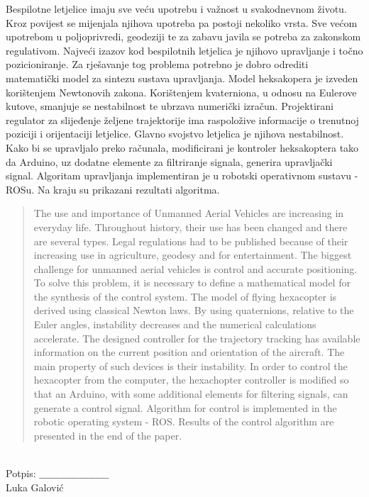 \documentclass[times, utf8, diplomski]{fer}
\begin{document}
\begin{sazetak}
Bespilotne letjelice imaju sve veću upotrebu i važnost u svakodnevnom životu. Kroz povijest se mijenjala njihova upotreba pa postoji nekoliko vrsta. Sve većom upotrebom u poljoprivredi, geodeziji te za zabavu javila se potreba za zakonskom regulativom. Najveći izazov kod bespilotnih letjelica je njihovo upravljanje i točno pozicioniranje. Za rješavanje tog problema potrebno je dobro odrediti matematički model za sintezu sustava upravljanja. Model heksakopera je izveden korištenjem Newtonovih zakona. Korištenjem kvaterniona, u odnosu na Eulerove kutove, smanjuje se nestabilnost te ubrzava numerički izračun. Projektirani regulator za slijeđenje željene trajektorije ima raspoložive informacije o trenutnoj poziciji i orijentaciji letjelice. Glavno svojstvo letjelica je njihova nestabilnost. Kako bi se upravljalo preko računala, modificirani je kontroler heksakoptera tako da Arduino, uz dodatne elemente za filtriranje signala, generira upravljački signal. Algoritam upravljanja implementiran je u robotski operativnom sustavu - ROSu. Na kraju su prikazani rezultati algoritma. 

\end{sazetak}
\newpage
\begin{abstract}
The use and importance of Unmanned Aerial Vehicles are increasing in everyday life. Throughout history, their use has been changed and there are several types. Legal regulations had to be published because of their increasing use in agriculture, geodesy and for entertainment. The biggest challenge for unmanned aerial vehicles is control and accurate positioning.
To solve this problem, it is necessary to define a mathematical model for the synthesis of the control system. The model of flying hexacopter is derived using classical Newton laws. By using quaternions, relative to the Euler angles, instability decreases and the numerical calculations accelerate. The designed controller for the trajectory tracking has available information on the current position and orientation of the aircraft. The main property of such devices is their instability. In order to control the hexacopter from the computer, the hexachopter controller is modified so that an Arduino, with some additional elements for filtering signals, can generate a control signal. Algorithm for control is implemented in the robotic operating system - ROS. Results of the control algorithm are presented in the end of the paper.

\end{abstract}\\

\hspace*{0pt}\hfill Potpis:  $\_\_\_\_\_\_\_\_\_\_\_\_\_\_\_\_\_\_\_\_\_$\\
\hspace*{5pt}\hfill Luka Galović
\end{document}
